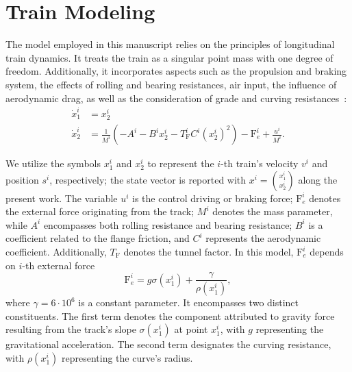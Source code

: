 \section{Train Modeling}
\label{sec:TrainModeling}

The model employed in this manuscript relies on the principles of longitudinal train dynamics. It treats the train as a singular point mass with one degree of freedom. Additionally, it incorporates aspects such as the propulsion and braking system, the effects of rolling and bearing resistances, air input, the influence of aerodynamic drag, as well as the consideration of grade and curving resistances~\cite{ltdModel}:
%
\begin{align}  \label{eq:stateDynamic}
	\dot{x}_1^i &= x_2^i  \nonumber \\
	\dot{x}_2^i &= \frac{1}{M^i}(-A^i-B^i x_2^i - T_\mathrm{F}^i C^i (x_2^i)^2)-\mathrm{F}_e^i + \frac{u^i}{M^i}.
\end{align}
%

We utilize the symbols ${x}_1^i$ and ${x}_2^i$ to represent the $i$-th train's velocity $v^i$ and position $s^i$, respectively; the state vector is reported with $x^i=\binom{x^i_1}{x^i_2}$  along the present work. The variable $u^i$ is the control driving or braking force; $\mathrm{F}_e^i$ denotes the external force originating from the track; $M^i$ denotes the mass parameter, while $A^i$ encompasses both rolling resistance and bearing resistance; $B^i$ is a coefficient related to the flange friction, and $C^i$ represents the aerodynamic coefficient. Additionally, $T_\mathrm{F}$ denotes the tunnel factor.
%
In this model, $\mathrm{F}^i_e$ depends on $i$-th external force
%
\begin{equation*}
	\mathrm{F}_e^i = g \sigma(x_1^i) + \frac{\gamma}{\rho(x_1^i)}, 
\end{equation*}
%
where $\gamma=6\cdot10^6$ is a constant parameter. It encompasses two distinct constituents. The first term denotes the component attributed to gravity force resulting from the track's slope $\sigma(x_1^i)$  at point $x_1^i$, with $g$ representing the gravitational acceleration. The second term designates the curving resistance, with ${\rho(x_1^i)}$ representing the curve's radius.


